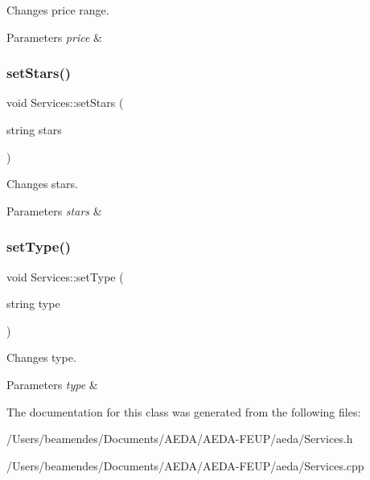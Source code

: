 Changes price range. 
\begin{DoxyParams}{Parameters}
{\em price} & \\
\hline
\end{DoxyParams}
\mbox{\label{class_services_a4cc0854b2f6bbb357f4e14d4ed753d2d}} 
\subsubsection{\texorpdfstring{set\+Stars()}{setStars()}}
{\footnotesize\ttfamily void Services\+::set\+Stars (\begin{DoxyParamCaption}\item[{string}]{stars }\end{DoxyParamCaption})\hspace{0.3cm}{\ttfamily [inline]}}

Changes stars. 
\begin{DoxyParams}{Parameters}
{\em stars} & \\
\hline
\end{DoxyParams}
\mbox{\label{class_services_ad299f8ec3b29a5fffc513ae9b89e4c1d}} 
\subsubsection{\texorpdfstring{set\+Type()}{setType()}}
{\footnotesize\ttfamily void Services\+::set\+Type (\begin{DoxyParamCaption}\item[{string}]{type }\end{DoxyParamCaption})\hspace{0.3cm}{\ttfamily [inline]}}

Changes type. 
\begin{DoxyParams}{Parameters}
{\em type} & \\
\hline
\end{DoxyParams}


The documentation for this class was generated from the following files\+:\begin{DoxyCompactItemize}
\item 
/\+Users/beamendes/\+Documents/\+A\+E\+D\+A/\+A\+E\+D\+A-\/\+F\+E\+U\+P/aeda/Services.\+h\item 
/\+Users/beamendes/\+Documents/\+A\+E\+D\+A/\+A\+E\+D\+A-\/\+F\+E\+U\+P/aeda/Services.\+cpp\end{DoxyCompactItemize}
